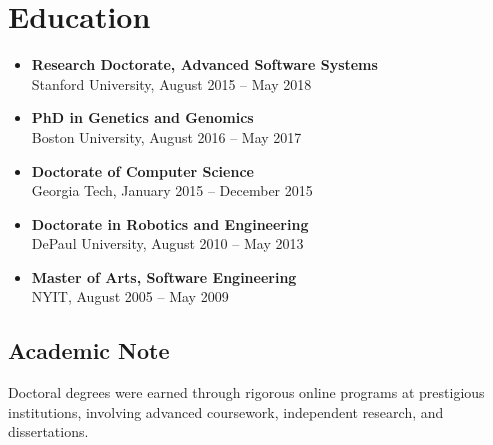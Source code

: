 \documentclass[a4paper,12pt]{article}
\begin{document}
\section*{Education}
\begin{itemize}[leftmargin=1.5em]
    \item \textbf{Research Doctorate, Advanced Software Systems} \\ Stanford University, August 2015 -- May 2018
    \item \textbf{PhD in Genetics and Genomics} \\ Boston University, August 2016 -- May 2017
    \item \textbf{Doctorate of Computer Science} \\ Georgia Tech, January 2015 -- December 2015
    \item \textbf{Doctorate in Robotics and Engineering} \\ DePaul University, August 2010 -- May 2013
    \item \textbf{Master of Arts, Software Engineering} \\ NYIT, August 2005 -- May 2009
\end{itemize}

\subsection*{Academic Note}
Doctoral degrees were earned through rigorous online programs at prestigious institutions, involving advanced coursework, independent research, and dissertations.
\end{document}
